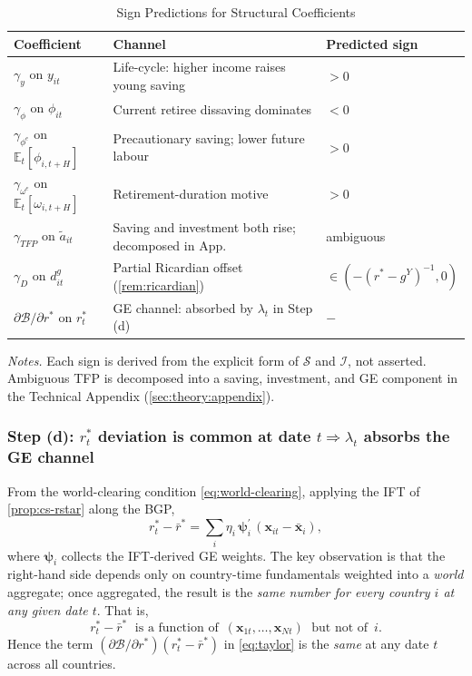 \begin{table}[t]
\centering
\caption{Sign Predictions for Structural Coefficients}\label{tab:signs}
\begin{threeparttable}
\begin{tabular}{lll}
\toprule
Coefficient & Channel & Predicted sign \\
\midrule
$\gamma_y$ on $y_{it}$ & Life-cycle: higher income raises young saving & $>0$ \\
$\gamma_\phi$ on $\phi_{it}$ & Current retiree dissaving dominates & $<0$ \\
$\gamma_{\phi^e}$ on $\mathbb{E}_t[\phi_{i,t+H}]$ & Precautionary saving; lower future labour & $>0$ \\
$\gamma_{\omega^e}$ on $\mathbb{E}_t[\omega_{i,t+H}]$ & Retirement-duration motive & $>0$ \\
$\gamma_{TFP}$ on $\tilde a_{it}$ & Saving and investment both rise; decomposed in App. & ambiguous \\
$\gamma_D$ on $d_{it}^g$ & Partial Ricardian offset (\cref{rem:ricardian}) & $\in(-(r^*-g^Y)^{-1},0)$ \\
$\partial\mathcal{B}/\partial r^*$ on $r_t^*$ & GE channel: absorbed by $\lambda_t$ in Step (d) & $-$ \\
\bottomrule
\end{tabular}
\begin{tablenotes}\footnotesize
\item \textit{Notes.} Each sign is derived from the explicit form of
$\mathcal{S}$ and $\mathcal{I}$, not asserted. Ambiguous TFP is decomposed
into a saving, investment, and GE component in the Technical Appendix
(\cref{sec:theory:appendix}).
\end{tablenotes}
\end{threeparttable}
\end{table}

\subsubsection*{Step (d): $r_t^*$ deviation is common at date $t\Rightarrow \lambda_t$ absorbs the GE channel}

From the world-clearing condition \eqref{eq:world-clearing}, applying the IFT
of \cref{prop:cs-rstar} along the BGP,
\[
r_t^*-\bar r^*=\sum_i \eta_i\,\boldsymbol\psi_i^{\prime}\,(\mathbf x_{it}-\bar{\mathbf x}_i),
\]
where $\boldsymbol\psi_i$ collects the IFT-derived GE weights. The key
observation is that the right-hand side depends only on country-time
fundamentals weighted into a \emph{world} aggregate; once aggregated, the
result is the \emph{same number for every country $i$ at any given date $t$}.
That is,
\[
r_t^*-\bar r^* \;\text{ is a function of }\, (\mathbf x_{1t},\ldots,\mathbf x_{Nt}) \;\text{ but not of }\, i.
\]
Hence the term $(\partial\mathcal{B}/\partial r^*)(r_t^*-\bar r^*)$ in
\eqref{eq:taylor} is the \emph{same} at any date $t$ across all countries.

